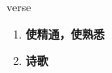 
\begin{frame}
{\huge verse}
\begin{center}
\begin{enumerate}\Large
  \item \textbf{使精通，使熟悉}
  \item \textbf{诗歌}
\end{enumerate}
\end{center}
\end{frame}
